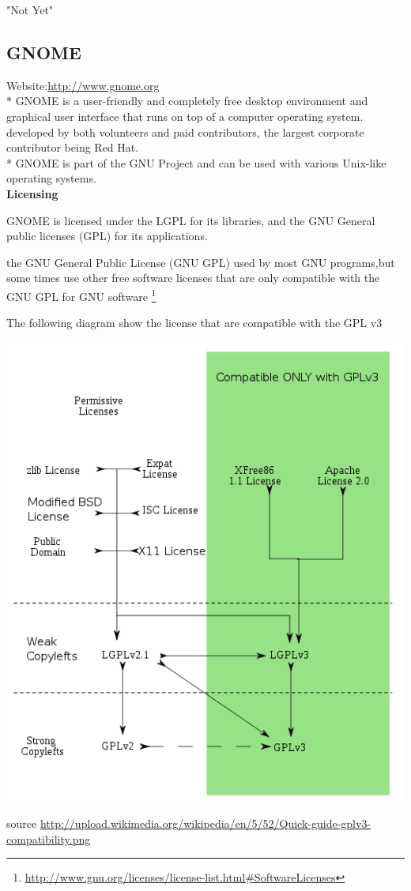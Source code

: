 \documentclass[11pt]{article} %
\begin{document}
"Not Yet" \\

 
\subsection{GNOME} %

Website:\url {http://www.gnome.org}\\*
GNOME is a user-friendly and completely free desktop environment and graphical user interface that runs on top of a computer operating system. developed by both volunteers and paid contributors, the largest corporate contributor being Red Hat. \\*
GNOME is part of the GNU Project and can be used with various Unix-like operating systems.\\
{\bf Licensing}


GNOME is licensed under the LGPL for its libraries, and the GNU General public licenses (GPL) for its applications.

 the GNU General Public License (GNU GPL) used by most GNU programs,but some times use  other free software licenses that are only compatible with the GNU GPL for GNU software 
\footnote {\url {http://www.gnu.org/licenses/license-list.html\#SoftwareLicenses}}

\centerline{ The  following diagram show the license that are compatible with the GPL v3} 
\centerline{\includegraphics[scale=0.4]{gplv3-compatibility}}
{ \tiny  source \url {http://upload.wikimedia.org/wikipedia/en/5/52/Quick-guide-gplv3-compatibility.png}}
\end{document}
